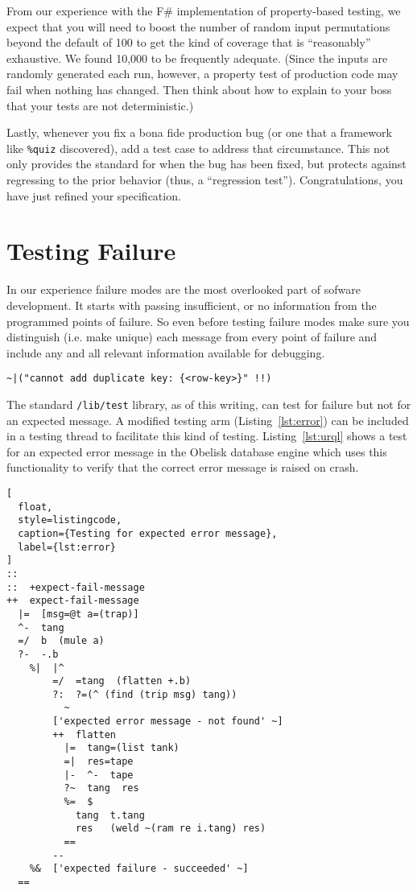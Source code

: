 \documentclass[twoside]{article}
\begin{document}
From our experience with the F\# implementation of property-based testing, we expect that you will need to boost the number of random input permutations beyond the default of 100 to get the kind of coverage that is ``reasonably'' exhaustive. We found 10,000 to be frequently adequate. (Since the inputs are randomly generated each run, however, a property test of production code may fail when nothing has changed. Then think about how to explain to your boss that your tests are not deterministic.)

Lastly, whenever you fix a bona fide production bug (or one that a framework like \texttt{\%quiz} discovered), add a test case to address that circumstance. This not only provides the standard for when the bug has been fixed, but protects against regressing to the prior behavior (thus, a “regression test”). Congratulations, you have just refined your specification.

\section{Testing Failure}

In our experience failure modes are the most overlooked part of sofware development. It starts with passing insufficient, or no information from the programmed points of failure. So even before testing failure modes make sure you distinguish (i.e. make unique) each message from every point of failure and include any and all relevant information available for debugging.

\begin{lstlisting}[style=listingcode]
~|("cannot add duplicate key: {<row-key>}" !!)
\end{lstlisting}

The standard \texttt{/lib/test} library, as of this writing, can test for failure but not for an expected message.  A modified testing arm (Listing~\ref{lst:error}) can be included in a testing thread to facilitate this kind of testing.  Listing~\ref{lst:urql} shows a test for an expected error message in the Obelisk database engine which uses this functionality to verify that the correct error message is raised on crash.

\begin{lstlisting}[
  float,
  style=listingcode,
  caption={Testing for expected error message},
  label={lst:error}
]
::
::  +expect-fail-message
++  expect-fail-message
  |=  [msg=@t a=(trap)]
  ^-  tang
  =/  b  (mule a)
  ?-  -.b
    %|  |^
        =/  =tang  (flatten +.b)
        ?:  ?=(^ (find (trip msg) tang))
          ~
        ['expected error message - not found' ~]
        ++  flatten
          |=  tang=(list tank)
          =|  res=tape
          |-  ^-  tape
          ?~  tang  res
          %=  $
            tang  t.tang
            res   (weld ~(ram re i.tang) res)
          ==
        --
    %&  ['expected failure - succeeded' ~]
  ==
\end{lstlisting}
\end{document}
